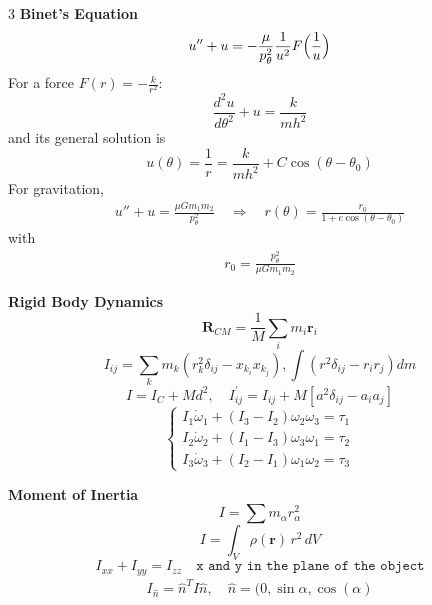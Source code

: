 \documentclass[1pt]{article}
\begin{document}
\begin{multicols}{3}
\textbf{Binet’s Equation}
\begin{equation*}
    u''+u=-\frac{\mu }{p_\theta^{2}}\frac{1}{u^{2}}F\Bigl(\frac{1}{u}\Bigr)
\end{equation*}
For a force \( F(r) = -\frac{k}{r^2} \):
\begin{equation*}
    \frac{d^2 u}{d\theta^2} + u = \frac{k}{m h^2}
\end{equation*}
and its general solution is
\begin{equation*}
    u(\theta) = \frac{1}{r} = \frac{k}{m h^2} + C \cos(\theta - \theta_0)
\end{equation*}
For gravitation,
\begin{align*}
    u'' + u = \frac{\mu G m_1 m_2}{p_\theta^2} \quad \Rightarrow \quad r(\theta) = \frac{r_0}{1 + e \cos(\theta - \theta_0)}
\end{align*}
with
\begin{align*}
    r_0 = \frac{p_\theta^2}{\mu G m_1 m_2}
\end{align*}


\textbf{Rigid Body Dynamics}
\begin{equation*}
    \mathbf{R}_{CM} = \frac{1}{M} \sum_i m_i \mathbf{r}_i
\end{equation*}
\begin{equation*}
    I_{ij} = \sum_k m_k \left( r_k^2 \delta_{ij} - x_{k_i} x_{k_j} \right), \int\left(r^{2}\delta_{ij}-r_{i}r_{j}\right)dm
\end{equation*}
\begin{equation*}
    I = I_C + Md^2,\quad I_{ij}^{\prime}=I_{ij}+M\left[a^{2}\delta_{ij}-a_{i}a_{j}\right]
\end{equation*}
\begin{equation*}
\begin{cases}
    I_1 \dot{\omega}_1 + (I_3 - I_2) \omega_2 \omega_3 = \tau_1 \\
    I_2 \dot{\omega}_2 + (I_1 - I_3) \omega_3 \omega_1 = \tau_2 \\
    I_3 \dot{\omega}_3 + (I_2 - I_1) \omega_1 \omega_2 = \tau_3
\end{cases}
\end{equation*}

\textbf{Moment of Inertia}
\begin{equation}
    I = \sum m_{\alpha} r_{\alpha}^2
\end{equation}
\[
I = \int_V \rho(\mathbf{r})\, r^2\, dV
\]
\begin{equation*}
    I_{xx} + I_{yy} = I_{zz} \quad \texttt{x and y in the plane of the object}
\end{equation*}
\begin{align*}
    I_\hat{n}=\hat{n}^TI\hat{n},\quad \hat{n}=(0,\sin\alpha,\cos(\alpha)
\end{align*}



\end{multicols}
\end{document}
